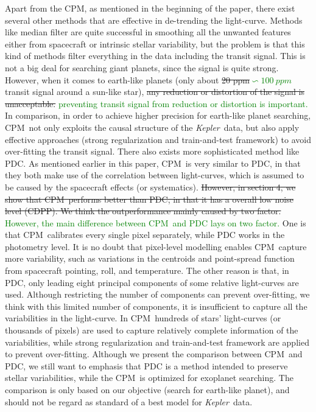 \documentclass[12pt, preprint]{aastex}
\newcommand{\project}[1]{\textsl{#1}}
\newcommand{\Kepler}{\project{Kepler}}
\newcommand{\name}{CPM}
\newcommand{\revise}[1]{\textcolor{green}{#1}}
\newcommand{\remove}[1]{\sout{#1}}
\begin{document}
Apart from the \name, as mentioned in the beginning of the paper, 
  there exist several other methods that are effective in de-trending the light-curve.
Methods like median filter are quite successful in smoothing all the unwanted features 
  either from spacecraft or intrinsic stellar variability, 
  but the problem is that this kind of methods filter everything in the data including the transit signal. 
This is not a big deal for searching giant planets, since the signal is quite strong. 
However, 
  when it comes to earth-like planets (only about \remove{20 ppm}\revise{$\backsim 100\ ppm$} transit signal around a sun-like star),
  \remove{any reduction or distortion of the signal is unacceptable.}
  \revise{preventing transit signal from reduction or distortion is important.} 
In comparison, in order to achieve higher precision for earth-like planet searching, 
  \name\  not only exploits the causal structure of the \Kepler\ data,
  but also apply effective approaches (strong regularization and train-and-test framework)
  to avoid over-fitting the transit signal.
There also exists more sophisticated method like PDC.
As mentioned earlier in this paper, 
  \name\ is very similar to PDC, 
  in that they both make use of the correlation between light-curves,
  which is assumed to be caused by the spacecraft effects (or systematics).
\remove{However, in section 4, we show that \name\ performs better than PDC, 
  in that it has a overall low noise level (CDPP).
We think the outperformance mainly caused by two factor.}
\revise{However, the main difference between \name\ and PDC lays on two factor.}
One is that \name\ calibrates every single pixel separately, 
  while PDC works in the photometry level.
It is no doubt that pixel-level modelling enables \name\ capture more variability, such as 
variations in the centroids and point-spread function from spacecraft pointing, roll, and temperature.
The other reason is that,  
  in PDC,  only leading eight principal components of some relative light-curves are used.
Although restricting the number of components can prevent over-fitting, we think with this limited number of components, 
  it is insufficient to capture all the variabilities in the light-curve.
In \name\, hundreds of stars' light-curves (or thousands of pixels) are used 
  to capture relatively complete information of the variabilities, 
  while strong regularization and train-and-test framework are applied to prevent over-fitting.
Although we present the comparison between \name\ and PDC, 
  we still want to emphasis that PDC is a method intended to preserve stellar variabilities, 
  while the \name\ is optimized for exoplanet searching. 
The comparison is only based on our objective (search for earth-like planet), 
  and should not be regard as standard of a best model for \Kepler\ data.
  
\end{document}
